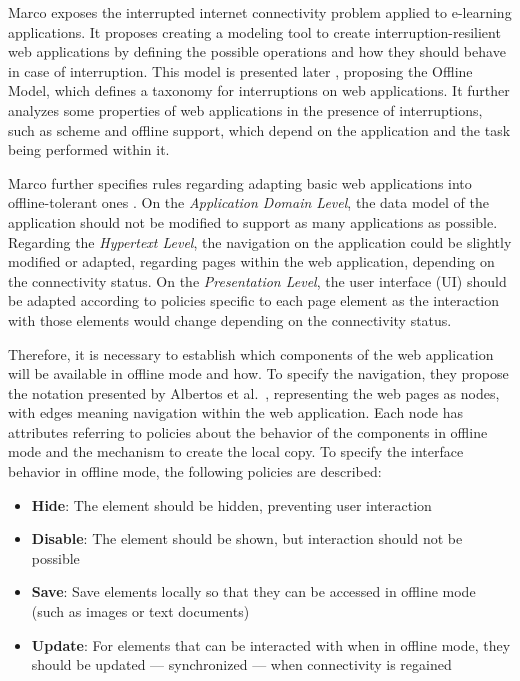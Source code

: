Marco \cite{Marco2013} exposes the interrupted internet connectivity problem applied to e-learning applications. It proposes creating a modeling tool to create interruption-resilient web applications by defining the possible operations and how they should behave in case of interruption. This model is presented later \cite{Abertos-Marco2017}, proposing the Offline Model, which defines a taxonomy for interruptions on web applications. It further analyzes some properties of web applications in the presence of interruptions, such as scheme and offline support, which depend on the application and the task being performed within it.

Marco further specifies rules regarding adapting basic web applications into offline-tolerant ones \cite{Marco2015}. On the \textit{Application Domain Level}, the data model of the application should not be modified to support as many applications as possible. Regarding the \textit{Hypertext Level}, the navigation on the application could be slightly modified or adapted, regarding pages within the web application, depending on the connectivity status. On the \textit{Presentation Level}, the user interface (UI) should be adapted according to policies specific to each page element as the interaction with those elements would change depending on the connectivity status.

Therefore, it is necessary to establish which components of the web application will be available in offline mode and how.
To specify the navigation, they propose the notation presented by Albertos et al.\ \cite{Penichet2013}, representing the web pages as nodes, with edges meaning navigation within the web application. Each node has attributes referring to policies about the behavior of the components in offline mode and the mechanism to create the local copy. To specify the interface behavior in offline mode, the following policies are described:

\begin{itemize}
    \item \textbf{Hide}: The element should be hidden, preventing user interaction
    \item \textbf{Disable}: The element should be shown, but interaction should not be possible
    \item \textbf{Save}: Save elements locally so that they can be accessed in offline mode (such as images or text documents)
    \item \textbf{Update}: For elements that can be interacted with when in offline mode, they should be updated --- synchronized --- when connectivity is regained
\end{itemize}

